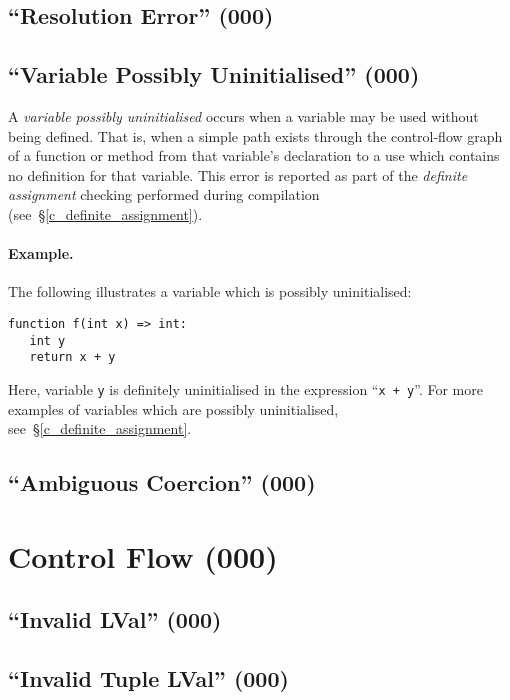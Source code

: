 \subsection{``Resolution Error'' (000)}

\subsection{``Variable Possibly Uninitialised'' (000)}
\label{c_err_var_uninitialised}
A {\em variable possibly uninitialised} occurs when a variable may be used without being defined.  That is, when a simple path exists through the control-flow graph of a function or method from that variable's declaration to a use which contains no definition for that variable.  This error is reported as part of the {\em definite assignment} checking performed during compilation (see~\S\ref{c_definite_assignment}).

\paragraph{Example.}  The following illustrates a variable which is possibly uninitialised:

\begin{lstlisting}
function f(int x) => int:
   int y
   return x + y
\end{lstlisting}

Here, variable \lstinline{y} is definitely uninitialised in the expression ``\lstinline{x + y}''.  For more examples of variables which are possibly uninitialised, see~\S\ref{c_definite_assignment}.



\subsection{``Ambiguous Coercion'' (000)}


\section{Control Flow (000)}

\subsection{``Invalid LVal'' (000)}

\subsection{``Invalid Tuple LVal'' (000)}

